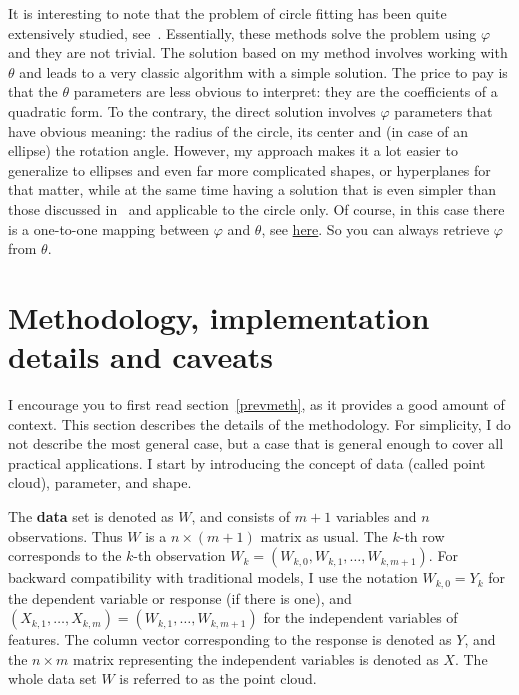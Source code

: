 \documentclass[oneside,10pt]{book}
\begin{document}
It is interesting to note that the problem of circle fitting has been quite extensively studied, see~\cite{ieee200y}. Essentially, these
 methods solve the problem using $\varphi$ and they are not trivial. The solution based on my method
 involves working with $\theta$ and leads to a very classic algorithm with a simple solution. The price to pay is that the $\theta$
 parameters are less obvious to interpret: they are the coefficients of a quadratic form. To the contrary, the direct solution
 involves $\varphi$ parameters that have obvious meaning: the radius of the circle, its center and (in case of an ellipse) the rotation angle.
However, my approach makes it a lot easier to generalize to ellipses
 and even far more complicated shapes, or hyperplanes for that matter, while at the same time having a solution that is even simpler than those discussed in~\cite{ieee200y} and applicable to
 the circle only. Of course, in this case there is a one-to-one mapping between $\varphi$ and $\theta$, see
 \href{https://math.stackexchange.com/questions/1810677/center-and-axis-of-quadratic-surface}{here}. So you can always retrieve
 $\varphi$ from $\theta$.


\section{Methodology, implementation details and caveats}

I encourage you to first read section~\ref{prevmeth}, as it provides a good amount of context. This section describes the details of the methodology.
For simplicity, I do not describe the most general case, but a case that is general enough to cover all practical applications. I start by introducing the concept of data (called point cloud), parameter, and shape.

The {\bf data} set is denoted
 as $W$, and consists of $m+1$ variables and $n$ observations. Thus $W$ is a $n \times (m+1)$ matrix as usual. The $k$-th row
 corresponds to the $k$-th observation $W_k=(W_{k,0},W_{k,1},\dots,W_{k, m+1})$. For backward compatibility with traditional models, I use the notation $W_{k,0}=Y_k$ for the dependent variable or response (if there is one), and $(X_{k,1},\dots,X_{k,m})=(W_{k,1},\dots,W_{k, m+1})$ for
 the independent variables of features. The column vector corresponding to the response is denoted as $Y$, and the $n\times m$ matrix
 representing the independent variables is denoted as $X$. The whole data set $W$ is referred to as the point cloud.
\end{document}
